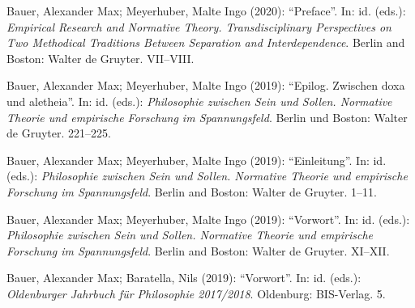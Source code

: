 \documentclass[a4paper,10pt]{article}
\newenvironment{literature}{%
   \parskip6pt\parindent0pt\raggedright
   \def\lititem{\hangindent=1cm\hangafter1}}{%
   \par\ignorespaces}
\begin{document}
\begin{literature}
\lititem Bauer, Alexander Max; Meyerhuber, Malte Ingo (2020): \enquote{Preface}. In: id. (eds.): \textit{Empirical Research and Normative Theory. Transdisciplinary Perspectives on Two Methodical Traditions Between Separation and Interdependence}. Berlin and Boston: Walter de Gruyter. VII--VIII.

\lititem Bauer, Alexander Max; Meyerhuber, Malte Ingo (2019): \enquote{Epilog. Zwischen doxa und aletheia}. In: id. (eds.): \textit{Philosophie zwischen Sein und Sollen. Normative Theorie und empirische Forschung im Spannungsfeld}. Berlin und Boston: Walter de Gruyter. 221--225.

\lititem Bauer, Alexander Max; Meyerhuber, Malte Ingo (2019): \enquote{Einleitung}. In: id. (eds.): \textit{Philosophie zwischen Sein und Sollen. Normative Theorie und empirische Forschung im Spannungsfeld}. Berlin and Boston: Walter de Gruyter. 1--11.

\lititem Bauer, Alexander Max; Meyerhuber, Malte Ingo (2019): \enquote{Vorwort}. In: id. (eds.): \textit{Philosophie zwischen Sein und Sollen. Normative Theorie und empirische Forschung im Spannungsfeld}. Berlin and Boston: Walter de Gruyter. XI--XII.

\lititem Bauer, Alexander Max; Baratella, Nils (2019): \enquote{Vorwort}. In: id. (eds.): \textit{Oldenburger Jahrbuch für Philosophie 2017/2018}. Oldenburg: BIS-Verlag. 5.
\end{literature}
\end{document}
